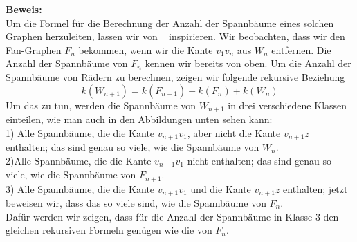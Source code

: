 \textbf{Beweis:}\\
Um die Formel für die Berechnung der Anzahl der Spannbäume eines solchen Graphen herzuleiten, lassen wir von ~\cite{sedlacek_1970} inspirieren.
Wir beobachten, dass wir den Fan-Graphen $F_n$ bekommen, wenn wir die Kante $v_1v_n$ aus $W_n$ entfernen.
Die Anzahl der Spannbäume von $F_n$ kennen wir bereits von oben.
Um die Anzahl der Spannbäume von Rädern zu berechnen, zeigen wir folgende rekursive Beziehung
\begin{equation}
 \mathit{k}(W_{n+1}) = \mathit{k}(F_{n+1}) + \mathit{k}(F_n) + \mathit{k}(W_n)
\end{equation}
Um das zu tun, werden die Spannbäume von $W_{n+1}$ in drei verschiedene Klassen einteilen, wie man auch in den Abbildungen unten sehen kann:\\%
1) Alle Spannbäume, die die Kante $v_{n+1}v_1$, aber nicht die Kante $v_{n+1}z$ enthalten; das sind genau so viele, wie die Spannbäume von $W_n$. \\%
2)Alle Spannbäume, die die Kante $v_{n+1}v_1$ nicht enthalten; das sind genau so viele, wie die Spannbäume von $F_{n+1}$.\\%
3) Alle Spannbäume, die die Kante $v_{n+1}v_1$ und die Kante $v_{n+1}z$ enthalten; jetzt beweisen wir, dass das so viele sind, wie die Spannbäume von $F_n$.\\
Dafür werden wir zeigen, dass für die Anzahl der Spannbäume in Klasse $3$ den gleichen rekursiven Formeln genügen wie die von $F_n$.\\
